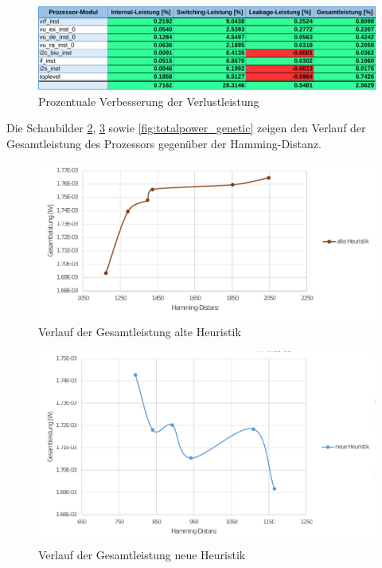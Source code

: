 \begin{figure}[H]
	\centering
	\includegraphics[width=\textwidth]{fig/power_percent_genetic.pdf}
	\caption{Prozentuale Verbesserung der Verlustleistung}
	\label{fig:power_percent_genetic}
\end{figure}

Die Schaubilder \ref{fig:totalpower_old}, \ref{fig:totalpower_new} sowie \ref{fig:totalpower_genetic} zeigen den Verlauf der Gesamtleistung des Prozessors gegenüber der Hamming-Distanz.

\begin{figure}[H]
	\centering
	\includegraphics[width=\textwidth]{fig/totalpower_old.pdf}
	\caption{Verlauf der Gesamtleistung alte Heuristik }
	\label{fig:totalpower_old}
\end{figure}

\begin{figure}[H]
	\centering
	\includegraphics[width=\textwidth]{fig/totalpower_new.pdf}
	\caption{Verlauf der Gesamtleistung neue Heuristik}
	\label{fig:totalpower_new}
\end{figure}

